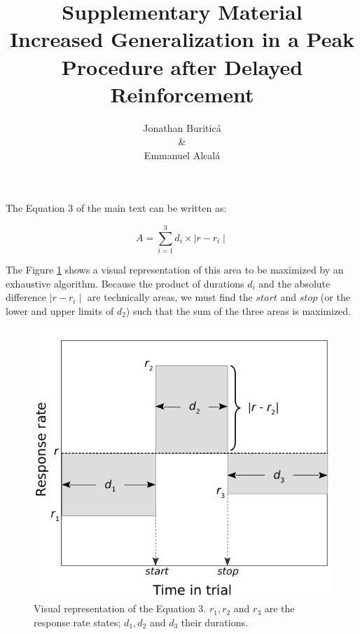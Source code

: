 \documentclass{article}
\title{Supplementary Material\\
	\vspace{1em}
	Increased Generalization in a Peak Procedure after Delayed Reinforcement}
\author{Jonathan Buriticá\\ \& \\ Emmanuel Alcalá}
\date{}
\begin{document}
\maketitle
The Equation 3 of the main text can be written as:

\[
	A = \sum_{i=1}^{3}d_i\times \mid r - r_i \mid
\]

The Figure \ref{fig:fig1} shows a visual representation of this area to be maximized by an exhaustive algorithm. Because the product of durations $d_i$ and the absolute difference $\mid r - r_i \mid$ are technically areas, we must find the $start$ and $stop$ (or the lower and upper limits of $d_2$) such that the sum of the three areas is maximized.

\begin{figure}[ht]
	\centering
	\includegraphics[scale=0.8]{SM_figure_1.pdf}
	\caption{Visual representation of the Equation 3. $r_1, r_2$ and $r_3$ are the response rate states; $d_1, d_2$ and $d_3$ their durations.}
	\label{fig:fig1}
\end{figure}
\end{document}
